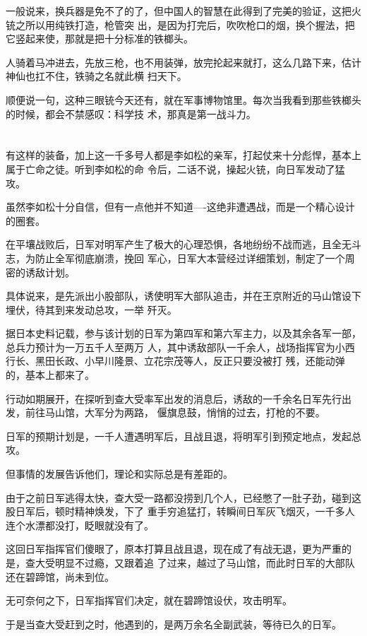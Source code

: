 \documentclass[11pt,a4paper,onecolumn]{article}
\begin{document}
一般说来，换兵器是免不了的了，但中国人的智慧在此得到了完美的验证，这把火铳之所以用纯铁打造，枪管突
出，是因为打完后，吹吹枪口的烟，换个握法，把它竖起来使，那就是把十分标准的铁榔头。

人骑着马冲进去，先放三枪，也不用装弹，放完抡起来就打，这么几路下来，估计神仙也扛不住，铁骑之名就此横
扫天下。

顺便说一句，这种三眼铳今天还有，就在军事博物馆里。每次当我看到那些铁榔头的时候，都会不禁感叹：科学技
术，那真是第一战斗力。

\section[\thesection]{}

有这样的装备，加上这一千多号人都是李如松的亲军，打起仗来十分彪悍，基本上属于亡命之徒。听到李如松的命
令后，二话不说，操起火铳，向日军发动了猛攻。

虽然李如松十分自信，但有一点他并不知道----这绝非遭遇战，而是一个精心设计的圈套。

在平壤战败后，日军对明军产生了极大的心理恐惧，各地纷纷不战而逃，且全无斗志，为防止全军彻底崩溃，挽回
军心，日军大本营经过详细策划，制定了一个周密的诱敌计划。

具体说来，是先派出小股部队，诱使明军大部队追击，并在王京附近的马山馆设下埋伏，待其到来发动总攻，一举
歼灭。

据日本史料记载，参与该计划的日军为第四军和第六军主力，以及其余各军一部，总兵力预计为一万五千人至两万
人，其中诱敌部队一千余人，战场指挥官为小西行长、黑田长政、小早川隆景、立花宗茂等人，反正只要没被打
残，还能动弹的，基本上都来了。

行动如期展开，在探听到查大受率军出发的消息后，诱敌的一千余名日军先行出发，前往马山馆，大军分为两路，
偃旗息鼓，悄悄的过去，打枪的不要。

日军的预期计划是，一千人遭遇明军后，且战且退，将明军引到预定地点，发起总攻。

但事情的发展告诉他们，理论和实际总是有差距的。

由于之前日军逃得太快，查大受一路都没捞到几个人，已经憋了一肚子劲，碰到这股日军后，顿时精神焕发，下了
重手穷追猛打，转瞬间日军灰飞烟灭，一千多人连个水漂都没打，眨眼就没有了。

这回日军指挥官们傻眼了，原本打算且战且退，现在成了有战无退，更为严重的是，查大受明显不过瘾，又跟着追
了过来，越过了马山馆，而此时日军的大部队还在碧蹄馆，尚未到位。

无可奈何之下，日军指挥官们决定，就在碧蹄馆设伏，攻击明军。

于是当查大受赶到之时，他遇到的，是两万余名全副武装，等待已久的日军。
\end{document}
